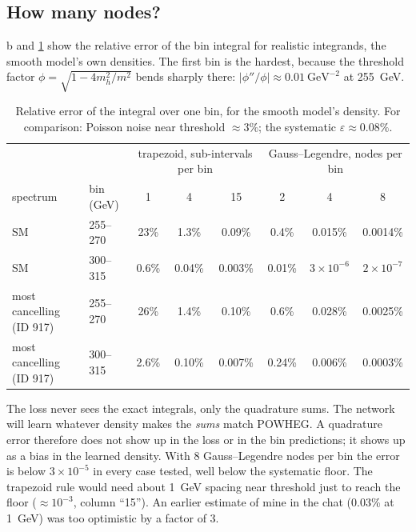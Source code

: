 \documentclass[11pt]{article}
\begin{document}
\subsection{How many nodes?}

b and \cref{tab:quad} show the relative error of the bin integral for realistic
integrands, the smooth model's own densities. The first bin is the hardest, because the threshold
factor $\phi = \sqrt{1-4m_h^2/m^2}$ bends sharply there: $|\phi''/\phi| \approx 0.01~\text{GeV}^{-2}$
at 255~GeV.

\begin{table}[h]
\centering
\small
\setlength{\tabcolsep}{4pt}
\begin{tabular}{llcccccc}
\toprule
 & & \multicolumn{3}{c}{trapezoid, sub-intervals per bin} & \multicolumn{3}{c}{Gauss--Legendre, nodes per bin}\\
spectrum & bin (GeV) & 1 & 4 & 15 & 2 & 4 & 8\\
\midrule
SM & 255--270 & 23\% & 1.3\% & 0.09\% & 0.4\% & 0.015\% & 0.0014\%\\
SM & 300--315 & 0.6\% & 0.04\% & 0.003\% & 0.01\% & $3\times10^{-6}$ & $2\times10^{-7}$\\
most cancelling (ID 917) & 255--270 & 26\% & 1.4\% & 0.10\% & 0.6\% & 0.028\% & 0.0025\%\\
most cancelling (ID 917) & 300--315 & 2.6\% & 0.10\% & 0.007\% & 0.24\% & 0.006\% & 0.0003\%\\
\bottomrule
\end{tabular}
\caption{Relative error of the integral over one bin, for the smooth model's density. For
comparison: Poisson noise near threshold $\approx 3\%$; the systematic $\varepsilon \approx 0.08\%$.}
\label{tab:quad}
\end{table}

\begin{watch}
The loss never sees the exact integrals, only the quadrature sums. The network will learn
whatever density makes the \emph{sums} match POWHEG. A quadrature error therefore does not show
up in the loss or in the bin predictions; it shows up as a bias in the learned density. With 8
Gauss--Legendre nodes per bin the error is below $3\times10^{-5}$ in every case tested, well below the
systematic floor. The trapezoid rule would need about 1~GeV spacing near threshold just to reach
the floor ($\approx 10^{-3}$, column ``15''). An earlier estimate of mine in the chat
(0.03\% at 1~GeV) was too optimistic by a factor of 3.
\end{watch}
\end{document}
